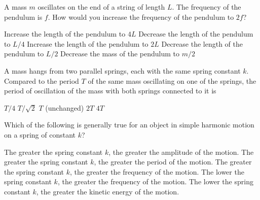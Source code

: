 \documentclass{../../../oss-classkick-exam}
\begin{document}
\begin{multicols*}{2}
\begin{questions}
    \question A mass $m$ oscillates on the end of a string of length $L$. The
    frequency of the pendulum is $f$. How would you increase the frequency of
    the pendulum to $2f$?
    \begin{center}
    \end{center}
    \begin{choices}
      \choice Increase the length of the pendulum to $4L$
      \choice Decrease the length of the pendulum to $L/4$
      \choice Increase the length of the pendulum to $2L$
      \choice Decrease the length of the pendulum to $L/2$
      \choice Decrease the mass of the pendulum to $m/2$
    \end{choices}
    \vspace{.7in}
    
    \question A mass hangs from two parallel springs, each with the same spring
    constant $k$. Compared to the period $T$ of the same mass oscillating on
    one of the springs, the period of oscillation of the mass with both
    springs connected to it is
    \begin{choices}
      \choice $T/4$
      \choice $T/\sqrt{2}$
      \choice $T$ (unchanged)
      \choice $2T$
      \choice $4T$
    \end{choices}
    \columnbreak
    
    \question Which of the following is generally true for an object in simple
    harmonic motion on a spring of constant $k$?
    \begin{choices}
      \choice The greater the spring constant $k$, the greater the amplitude of
      the motion.
      \choice The greater the spring constant $k$, the greater the period of
      the motion.
      \choice The greater the spring constant $k$, the greater the frequency of
      the motion.
      \choice The lower the spring constant $k$, the greater the frequency of
      the motion.
      \choice The lower the spring constant $k$, the greater the kinetic energy
      of the motion.
    \end{choices}
    \vspace{.7in}


\end{questions}
\end{multicols*}
\end{document}
